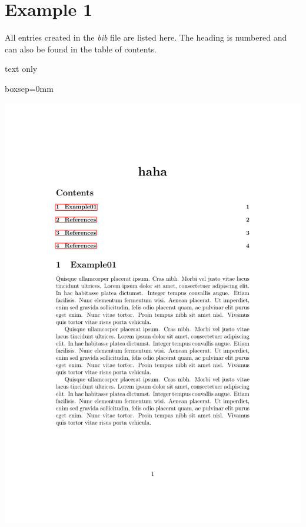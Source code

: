 \documentclass[]{myHOWTO-V001}
\begin{document}
\section{Example 1}

All entries created in the \emph{bib} file are listed here. The heading is numbered and can also be found in the table of contents.

\begin{myTEXEX}{text only}
\begin{mySTY}{boxsep=0mm}
\clearpage
\pagestyle{empty}
\printbibliography[heading=bibnumbered]
\clearpage
\pagestyle{plain}
\end{mySTY}

\tcblower

\begin{center}
	\begin{myFIG}{}
		\includegraphics[page=4, scale=0.35]{examples/example01.pdf}
	\end{myFIG}
\end{center}
\end{myTEXEX}
\end{document}
